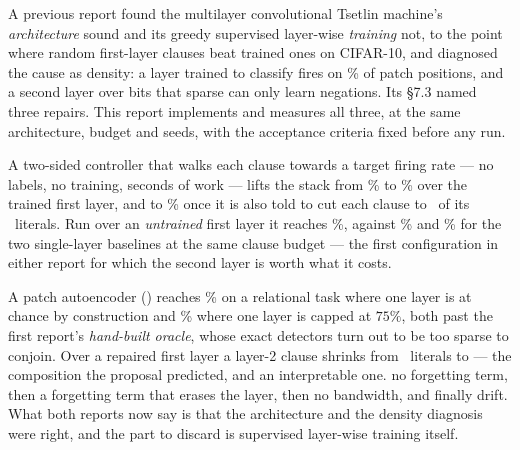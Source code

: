 A previous report found the multilayer convolutional Tsetlin machine's \emph{architecture}
sound and its greedy supervised layer-wise \emph{training} not, to the point where random
first-layer clauses beat trained ones on CIFAR-10, and diagnosed the cause as density: a layer
trained to classify fires on \fireGreedyPre{}\% of patch positions, and a second layer over
bits that sparse can only learn negations. Its \S7.3 named three repairs. This report
implements and measures all three, at the same architecture, budget and seeds, with the
acceptance criteria fixed before any run.

 A two-sided controller that walks
each clause towards a target firing rate --- no labels, no training, seconds of work --- lifts
the stack from \accMctm{}\% to \accMctmCalibRTwoZero{}\% over the trained first layer, and to
\sizeBestAcc{}\% once it is also told to cut each clause to \sizeBestTarget\ of its
\densityGreedySize\ literals. Run over an \emph{untrained} first layer it reaches
\randBestAcc{}\%, against \accSingleMatched{}\% and \accSingleRf{}\% for the two single-layer
baselines at the same clause budget --- the first configuration in either report for which the
second layer is worth what it costs.

 A patch autoencoder
(\ideaA) reaches \synNearAutoAuto{}\% on a relational task where one layer is at chance by
construction and \synXorAutoAuto{}\% where one layer is capped at $75\%$, both past the first
report's \emph{hand-built oracle}, whose exact detectors turn out to be too sparse to conjoin.
Over a repaired first layer a layer-2 clause shrinks from \synltwoNearMctmTask\ literals to
\synltwoNearCalibTask{} --- the composition the proposal predicted, and an interpretable one.
 no forgetting term, then a
forgetting term that erases the layer, then no bandwidth, and finally drift. What both reports
now say is that the architecture and the density diagnosis were right, and the part to discard
is supervised layer-wise training itself.
